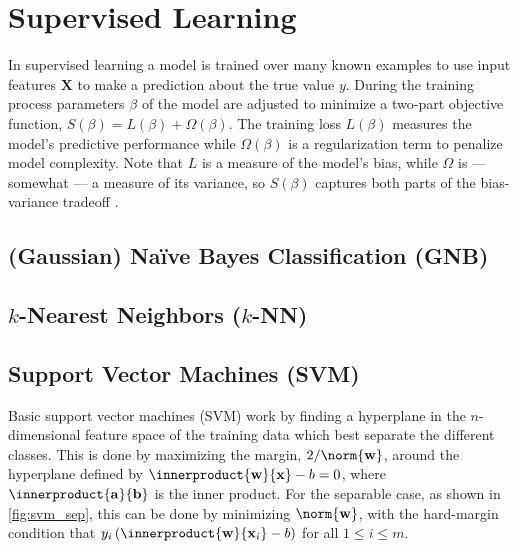 \chapter{Supervised Learning}
\label{ml:supervised}

In supervised learning a model is trained over many known examples
to use input features $\mathbf{X}$ to make a prediction \yhat about the true value $y$.
During the training process parameters $\beta$ of
the model are adjusted to minimize a two-part objective function,
$S\left(\beta\right) = L\left(\beta\right) + \Omega\left(\beta\right)$.
The training loss $L\left(\beta\right)$ measures the model's predictive performance
while $\Omega\left(\beta\right)$ is a regularization term to penalize model complexity.
Note that $L$ is a measure of the model's bias,
while $\Omega$ is --- somewhat --- a measure of its variance,
so $S\left(\beta\right)$ captures both parts of the bias-variance tradeoff \cite{HastieTF09}.

\section{(Gaussian) N{a\"i}ve Bayes Classification (GNB)}
\label{ml:supervised:Bayes}

\section{\texorpdfstring{$k$}{k}-Nearest Neighbors (\texorpdfstring{$k$}{k}-NN)}
\label{ml:supervised:kNN}

\section{Support Vector Machines (SVM)}
\label{ml:supervised:SVM}

Basic support vector machines (SVM) work by finding a hyperplane in the $n$-dimensional
feature space of the training data which best separate the different classes.
This is done by maximizing the margin, $2/\norm{\mathbf{w}}$,
around the hyperplane defined by $\innerproduct{\mathbf{w}}{\mathbf{x}} - b = 0$,
where $\innerproduct{\mathbf{a}}{\mathbf{b}}$ is the inner product.
For the separable case, as shown in \cref{fig:svm_sep}, this
can be done by minimizing $\norm{\mathbf{w}}$, with the hard-margin condition that
$y_{i} \left(\innerproduct{\mathbf{w}}{\mathbf{x}_{i}} - b\right)$ for all $1 \leq i \leq m$.

